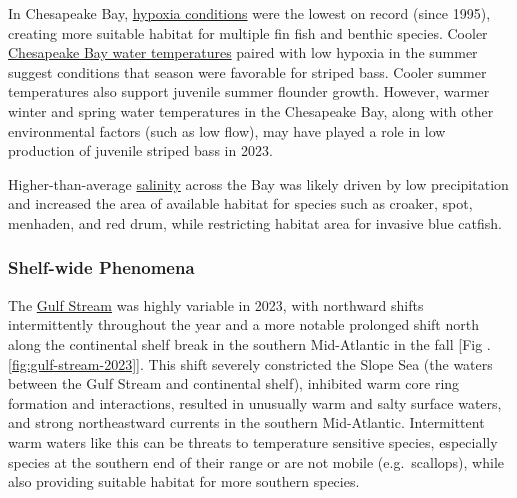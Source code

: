 \documentclass[
  10pt,
]{article}
\begin{document}
In Chesapeake Bay, \href{https://noaa-edab.github.io/catalog/chesapeake-bay-2023-synthesis.html}{hypoxia conditions} were the lowest on record (since 1995), creating more suitable habitat for multiple fin fish and benthic species. Cooler \href{https://noaa-edab.github.io/catalog/chesapeake-bay-seasonal-sea-surface-temperature-anomaly.html}{Chesapeake Bay water temperatures} paired with low hypoxia in the summer suggest conditions that season were favorable for striped bass. Cooler summer temperatures also support juvenile summer flounder growth. However, warmer winter and spring water temperatures in the Chesapeake Bay, along with other environmental factors (such as low flow), may have played a role in low production of juvenile striped bass in 2023.

Higher-than-average \href{https://noaa-edab.github.io/catalog/chesapeake-bay-salinity.html}{salinity} across the Bay was likely driven by low precipitation and increased the area of available habitat for species such as croaker, spot, menhaden, and red drum, while restricting habitat area for invasive blue catfish.

\hypertarget{shelf-wide-phenomena}{%
\subsubsection{Shelf-wide Phenomena}\label{shelf-wide-phenomena}}

The \href{https://noaa-edab.github.io/catalog/gulf-stream-index.html}{Gulf Stream} was highly variable in 2023, with northward shifts intermittently throughout the year and a more notable prolonged shift north along the continental shelf break in the southern Mid-Atlantic in the fall {[}Fig .\ref{fig:gulf-stream-2023}{]}. This shift severely constricted the Slope Sea (the waters between the Gulf Stream and continental shelf), inhibited warm core ring formation and interactions, resulted in unusually warm and salty surface waters, and strong northeastward currents in the southern Mid-Atlantic. Intermittent warm waters like this can be threats to temperature sensitive species, especially species at the southern end of their range or are not mobile (e.g.~scallops), while also providing suitable habitat for more southern species.
\end{document}
